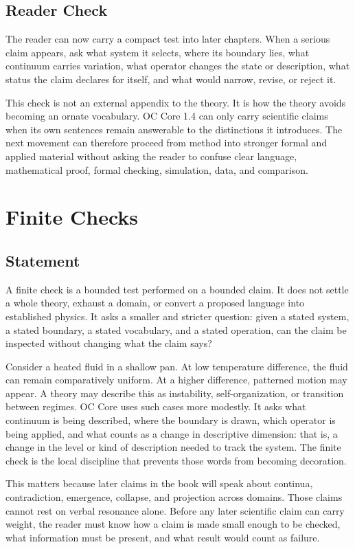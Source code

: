 \documentclass[11pt,a4paper,openany]{book}
\begin{document}
\subsection{Reader Check}
The reader can now carry a compact test into later chapters. When a serious claim appears, ask what system it selects, where its boundary lies, what continuum carries variation, what operator changes the state or description, what status the claim declares for itself, and what would narrow, revise, or reject it. \cite{goldenfeld_lectures,kadanoff_scaling}\par
This check is not an external appendix to the theory. It is how the theory avoids becoming an ornate vocabulary. OC Core 1.4 can only carry scientific claims when its own sentences remain answerable to the distinctions it introduces. The next movement can therefore proceed from method into stronger formal and applied material without asking the reader to confuse clear language, mathematical proof, formal checking, simulation, data, and comparison.\par
\section{Finite Checks}
\subsection{Statement}
A finite check is a bounded test performed on a bounded claim. It does not settle a whole theory, exhaust a domain, or convert a proposed language into established physics. It asks a smaller and stricter question: given a stated system, a stated boundary, a stated vocabulary, and a stated operation, can the claim be inspected without changing what the claim says? \cite{kadanoff_scaling,wilson_renormalization}\par
Consider a heated fluid in a shallow pan. At low temperature difference, the fluid can remain comparatively uniform. At a higher difference, patterned motion may appear. A theory may describe this as instability, self-organization, or transition between regimes. OC Core uses such cases more modestly. It asks what continuum is being described, where the boundary is drawn, which operator is being applied, and what counts as a change in descriptive dimension: that is, a change in the level or kind of description needed to track the system. The finite check is the local discipline that prevents those words from becoming decoration.\par
This matters because later claims in the book will speak about continua, contradiction, emergence, collapse, and projection across domains. Those claims cannot rest on verbal resonance alone. Before any later scientific claim can carry weight, the reader must know how a claim is made small enough to be checked, what information must be present, and what result would count as failure.\par
\end{document}
